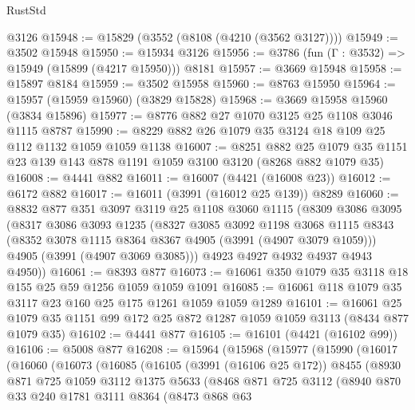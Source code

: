 \begin{lexlean}{RustStd}
\begin{coremodule}
    @3126
@15948 := @15829 (@3552 (@8108 (@4210 (@3562 @3127))))
@15949 := @3502 @15948
@15950 := @15934 @3126
@15956 := @3786 (fun (Γ : @3532) => @15949 (@15899 (@4217 @15950))) @8181
@15957 := @3669 @15948
@15958 := @15897 @8184
@15959 := @3502 @15958
@15960 := @8763 @15950
@15964 := @15957 (@15959 @15960) (@3829 @15828)
@15968 := @3669 @15958 @15960 (@3834 @15896)
@15977 := @8776 @882 @27 @1070 @3125 @25 @1108 @3046 @1115 @8787
@15990 := @8229 @882 @26 @1079 @35 @3124 @18 @109 @25 @112 @1132 @1059 @1059 @1138
@16007 := @8251
    @882
    @25
    @1079
    @35
    @1151
    @23
    @139
    @143
    @878
    @1191
    @1059
    @3100
    @3120
    (@8268 @882 @1079 @35)
@16008 := @4441 @882
@16011 := @16007 (@4421 (@16008 @23))
@16012 := @6172 @882
@16017 := @16011 (@3991 (@16012 @25 @139)) @8289
@16060 := @8832
    @877
    @351
    @3097
    @3119
    @25
    @1108
    @3060
    @1115
    (@8309
      @3086
      @3095
      (@8317
        @3086
        @3093
        @1235
        (@8327
          @3085
          @3092
          @1198
          @3068
          @1115
          @8343
          (@8352 @3078 @1115 @8364 @8367 @4905 (@3991 (@4907 @3079 @1059)))
          @4905
          (@3991 (@4907 @3069 @3085)))
        @4923
        @4927
        @4932
        @4937
        @4943
        @4950))
@16061 := @8393 @877
@16073 := @16061 @350 @1079 @35 @3118 @18 @155 @25 @59 @1256 @1059 @1059 @1091
@16085 := @16061 @118 @1079 @35 @3117 @23 @160 @25 @175 @1261 @1059 @1059 @1289
@16101 := @16061
    @25
    @1079
    @35
    @1151
    @99
    @172
    @25
    @872
    @1287
    @1059
    @1059
    @3113
    (@8434 @877 @1079 @35)
@16102 := @4441 @877
@16105 := @16101 (@4421 (@16102 @99))
@16106 := @5008 @877
@16208 := @15964
    (@15968
      (@15977
        (@15990
          (@16017
            (@16060
              (@16073
                (@16085
                  (@16105
                    (@3991 (@16106 @25 @172))
                    @8455
                    (@8930
                      @871
                      @725
                      @1059
                      @3112
                      @1375
                      @5633
                      (@8468
                        @871
                        @725
                        @3112
                        (@8940
                          @870
                          @33
                          @240
                          @1781
                          @3111
                          @8364
                          (@8473
                            @868
                            @63

\end{coremodule}
\end{lexlean}
